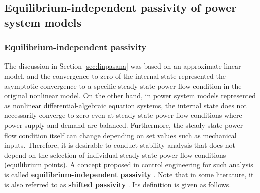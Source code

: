 \documentclass[graybox, envcountchap]{svmult}
\begin{document}
\subsection{Equilibrium-independent passivity of power system models\advanced}

\smallskip
\subsubsection{Equilibrium-independent passivity}

The discussion in Section \ref{sec:linpasana} was based on an approximate linear
model, and the convergence to zero of the internal state represented the
asymptotic convergence to a specific steady-state power flow condition in the
original nonlinear model. On the other hand, in power system models represented
as nonlinear differential-algebraic equation systems, the internal state does
not necessarily converge to zero even at steady-state power flow conditions
where power supply and demand are balanced. Furthermore, the steady-state power
flow condition itself can change depending on set values such as mechanical
inputs. Therefore, it is desirable to conduct stability analysis that does not
depend on the selection of individual steady-state power flow conditions
(equilibrium points). A concept proposed in control engineering for such
analysis is called \textbf{equilibrium-independent
passivity}
\cite{hines2011equilibrium,simpson2019equilibrium}.  Note that in some
literature, it is also referred to as \textbf{shifted passivity} \cite{monshizadeh2019conditions}.  Its definition is given as
follows.
\end{document}
